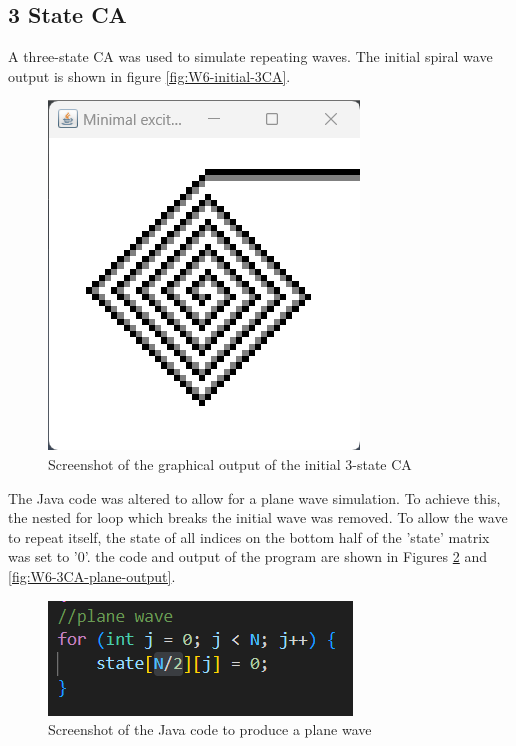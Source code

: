 \subsection{3 State CA}
A three-state CA was used to simulate repeating waves. The initial spiral wave output is shown in figure \autoref{fig:W6-initial-3CA}.

\begin{figure}[H] 
    \centering
    \includegraphics[width=0.49\columnwidth]{Figures/Week 6/3stateCA-Initial.png}
    \caption{Screenshot of the graphical output of the initial 3-state CA}
    \label{fig:W6-initial-3CA}
\end{figure}

The Java code was altered to allow for a plane wave simulation. To achieve this, the nested for loop which breaks the initial wave was removed. To allow the wave to repeat itself, the state of all indices on the bottom half of the 'state' matrix was set to '0'. the code and output of the program are shown in Figures \ref{fig:W6-3CA-plane-code} and \ref{fig:W6-3CA-plane-output}. 


\begin{figure}[H] 
    \centering
    \includegraphics[width=0.49\columnwidth]{Figures/Week 6/3stateCA-plane-code.png}
    \caption{Screenshot of the Java code to produce a plane wave}
    \label{fig:W6-3CA-plane-code}
\end{figure}

